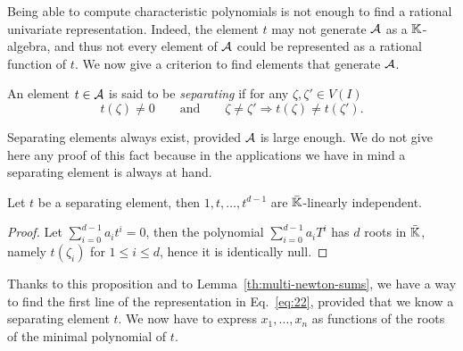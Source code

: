 Being able to compute characteristic polynomials is not enough to find
a rational univariate representation. Indeed, the element $t$ may not
generate $\mathcal{A}$ as a $\mathbb{K}$-algebra, and thus not every element of
$\mathcal{A}$ could be represented as a rational function of $t$. We now
give a criterion to find elements that generate $\mathcal{A}$.

\begin{definition}
  An element $t\in\mathcal{A}$ is said to be \emph{separating} if for
  any $\zeta,\zeta'\in V(I)$
  \[t(\zeta)\ne0 \qquad\text{and}\qquad \zeta\ne\zeta'\Rightarrow t(\zeta)\ne t(\zeta')\text{.}\]
\end{definition}

Separating elements always exist, provided $\mathcal{A}$ is large
enough. We do not give here any proof of this fact because in the
applications we have in mind a separating element is always at hand.

\begin{proposition}
  Let $t$ be a separating element, then $1,t,\ldots,t^{d-1}$ are
  $\bar{\mathbb{K}}$-linearly independent.
\end{proposition}
\begin{proof}
  Let $\sum_{i=0}^{d-1}a_it^i =0$, then the polynomial
  $\sum_{i=0}^{d-1}a_iT^i$ has $d$ roots in $\bar{\mathbb{K}}$, namely
  $t(\zeta_i)$ for $1\le i \le d$, hence it is identically null.
\end{proof}

Thanks to this proposition and to Lemma~\ref{th:multi-newton-sums}, we
have a way to find the first line of the representation in
Eq.~\eqref{eq:22}, provided that we know a separating element $t$. We
now have to express $x_1,\ldots,x_n$ as functions of the roots of the
minimal polynomial of $t$.

